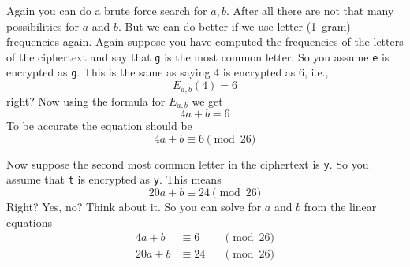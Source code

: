 

Again you can do a brute force search for $a,b$. After all there are
not that many possibilities for $a$ and $b$. But we can do better if
we use letter (1--gram) frequencies again. Again suppose you have
computed the frequencies of the letters of the ciphertext and say
that \texttt{g} is the most common letter. So you assume \texttt{e}
is encrypted as \texttt{g}. This is the same as saying $4$ is
encrypted as $6$, i.e.,
\[
 E_{a,b}(4) = 6
\]
right? Now using the formula for $E_{a,b}$ we get
\[
 4a + b = 6
 \]
 To be accurate the equation should be
\[
 4a + b \equiv 6 \pmod{26}
 \]
 
Now suppose the second most common letter in the ciphertext is
\texttt{y}. So you assume that \texttt{t} is encrypted as
\texttt{y}. This means
\[
 20a + b \equiv 24 \pmod{26}
\]
Right? Yes, no? Think about it. So you can solve for $a$ and $b$
from the linear equations
\begin{alignat*}
 4a + b  &\equiv   6 &&\pmod{26}\\
 20a + b &\equiv 24  &&\pmod{26}
\end{alignat*}




